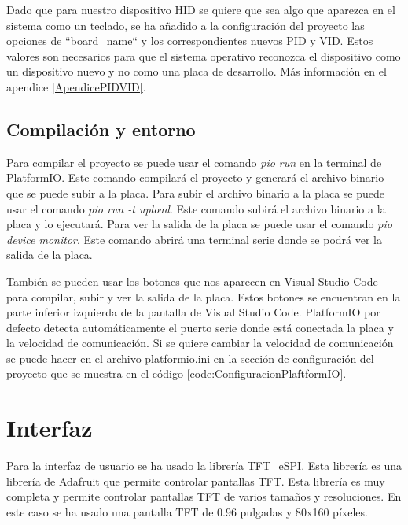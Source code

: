 \begin{tcolorbox}[colback=blue!5!white, colframe=blue!55!white, title=Nota]
    Dado que para nuestro dispositivo \gls{HID} se quiere que sea algo que aparezca en el sistema como un teclado, se ha añadido a la configuración del proyecto las opciones de ``board\_name`` y los correspondientes nuevos \gls{PID} y \gls{VID}. Estos valores son necesarios para que el sistema operativo reconozca el dispositivo como un dispositivo nuevo y no como una placa de desarrollo. Más información en el apendice \ref{ApendicePIDVID}.
\end{tcolorbox}

\subsection{Compilación y entorno}

Para compilar el proyecto se puede usar el comando \textit{pio run} en la terminal de \gls{PlatformIO}. Este comando compilará el proyecto y generará el archivo binario que se puede subir a la placa. Para subir el archivo binario a la placa se puede usar el comando \textit{pio run -t upload}. Este comando subirá el archivo binario a la placa y lo ejecutará. Para ver la salida de la placa se puede usar el comando \textit{pio device monitor}. Este comando abrirá una terminal serie donde se podrá ver la salida de la placa.

También se pueden usar los botones que nos aparecen en Visual Studio Code para compilar, subir y ver la salida de la placa. Estos botones se encuentran en la parte inferior izquierda de la pantalla de Visual Studio Code. \gls{PlatformIO} por defecto detecta automáticamente el puerto serie donde está conectada la placa y la velocidad de comunicación. Si se quiere cambiar la velocidad de comunicación se puede hacer en el archivo platformio.ini en la sección de configuración del proyecto que se muestra en el código \ref{code:ConfiguracionPlaftformIO}.


\section{Interfaz}

Para la interfaz de usuario se ha usado la librería TFT\_eSPI. Esta librería es una librería de Adafruit que permite controlar pantallas \gls{TFT}. Esta librería es muy completa y permite controlar pantallas \gls{TFT} de varios tamaños y resoluciones. En este caso se ha usado una pantalla \gls{TFT} de 0.96 pulgadas y 80x160 píxeles.

